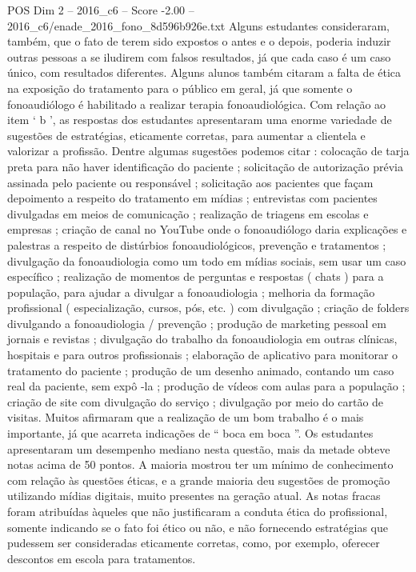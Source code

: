 \begin{textsample}{POS Dim 2 – 2016\_c6 – Score -2.00 – 2016\_c6/enade\_2016\_fono\_8d596b926e.txt}
Alguns estudantes consideraram, também, que o fato de terem sido expostos o antes e o depois, poderia induzir outras pessoas a se iludirem com falsos resultados, já que cada caso é um caso único, com resultados diferentes.
Alguns alunos também citaram a falta de ética na exposição do tratamento para o público em geral, já que somente o fonoaudiólogo é habilitado a realizar terapia fonoaudiológica.
Com relação ao item ‘ b ’, as respostas dos estudantes apresentaram uma enorme variedade de sugestões de estratégias, eticamente corretas, para aumentar a clientela e valorizar a profissão.
Dentre algumas sugestões podemos citar : colocação de tarja preta para não haver identificação do paciente ; solicitação de autorização prévia assinada pelo paciente ou responsável ; solicitação aos pacientes que façam depoimento a respeito do tratamento em mídias ; entrevistas com pacientes divulgadas em meios de comunicação ; realização de triagens em escolas e empresas ; criação de canal no YouTube onde o fonoaudiólogo daria explicações e palestras a respeito de distúrbios fonoaudiológicos, prevenção e tratamentos ; divulgação da fonoaudiologia como um todo em mídias sociais, sem usar um caso específico ; realização de momentos de perguntas e respostas ( chats ) para a população, para ajudar a divulgar a fonoaudiologia ; melhoria da formação profissional ( especialização, cursos, pós, etc. ) com divulgação ; criação de folders divulgando a fonoaudiologia / prevenção ; produção de marketing pessoal em jornais e revistas ; divulgação do trabalho da fonoaudiologia em outras clínicas, hospitais e para outros profissionais ; elaboração de aplicativo para monitorar o tratamento do paciente ; produção de um desenho animado, contando um caso real da paciente, sem expô -la ; produção de vídeos com aulas para a população ; criação de site com divulgação do serviço ; divulgação por meio do cartão de visitas.
Muitos afirmaram que a realização de um bom trabalho é o mais importante, já que acarreta indicações de “ boca em boca ”.
Os estudantes apresentaram um desempenho mediano nesta questão, mais da metade obteve notas acima de 50 pontos.
A maioria mostrou ter um mínimo de conhecimento com relação às questões éticas, e a grande maioria deu sugestões de promoção utilizando mídias digitais, muito presentes na geração atual.
As notas fracas foram atribuídas àqueles que não justificaram a conduta ética do profissional, somente indicando se o fato foi ético ou não, e não fornecendo estratégias que pudessem ser consideradas eticamente corretas, como, por exemplo, oferecer descontos em escola para tratamentos.

\end{textsample}
